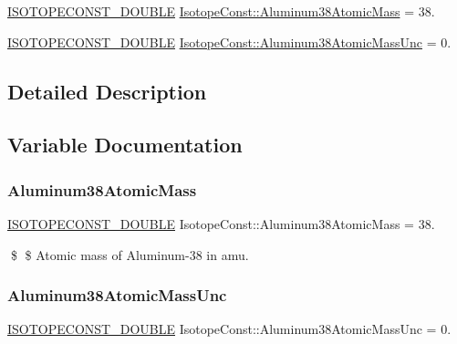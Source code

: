 \begin{DoxyCompactItemize}
\item 
\mbox{\hyperlink{group___isotope_const-_macros_ga8f45a7272ce02c0b4c65c44636ed719a}{I\+S\+O\+T\+O\+P\+E\+C\+O\+N\+S\+T\+\_\+\+D\+O\+U\+B\+LE}} \mbox{\hyperlink{group___isotope_const-_aluminum-_al38_ga36788eb648332d036e538a0da4cd7d0f}{Isotope\+Const\+::\+Aluminum38\+Atomic\+Mass}} = 38.
\item 
\mbox{\hyperlink{group___isotope_const-_macros_ga8f45a7272ce02c0b4c65c44636ed719a}{I\+S\+O\+T\+O\+P\+E\+C\+O\+N\+S\+T\+\_\+\+D\+O\+U\+B\+LE}} \mbox{\hyperlink{group___isotope_const-_aluminum-_al38_ga270eb29aa84d8f500cd141ffa430c282}{Isotope\+Const\+::\+Aluminum38\+Atomic\+Mass\+Unc}} = 0.
\end{DoxyCompactItemize}


\subsection{Detailed Description}


\subsection{Variable Documentation}
\mbox{\label{group___isotope_const-_aluminum-_al38_ga36788eb648332d036e538a0da4cd7d0f}} 
\subsubsection{\texorpdfstring{Aluminum38\+Atomic\+Mass}{Aluminum38AtomicMass}}
{\footnotesize\ttfamily \mbox{\hyperlink{group___isotope_const-_macros_ga8f45a7272ce02c0b4c65c44636ed719a}{I\+S\+O\+T\+O\+P\+E\+C\+O\+N\+S\+T\+\_\+\+D\+O\+U\+B\+LE}} Isotope\+Const\+::\+Aluminum38\+Atomic\+Mass = 38.}

\$ \$ Atomic mass of Aluminum-\/38 in amu. \mbox{\label{group___isotope_const-_aluminum-_al38_ga270eb29aa84d8f500cd141ffa430c282}} 
\subsubsection{\texorpdfstring{Aluminum38\+Atomic\+Mass\+Unc}{Aluminum38AtomicMassUnc}}
{\footnotesize\ttfamily \mbox{\hyperlink{group___isotope_const-_macros_ga8f45a7272ce02c0b4c65c44636ed719a}{I\+S\+O\+T\+O\+P\+E\+C\+O\+N\+S\+T\+\_\+\+D\+O\+U\+B\+LE}} Isotope\+Const\+::\+Aluminum38\+Atomic\+Mass\+Unc = 0.}

